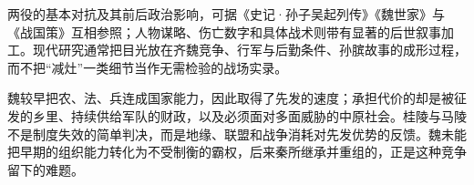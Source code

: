 \begin{sourcenote}[桂陵、马陵与魏国衰势]
两役的基本对抗及其前后政治影响，可据《史记·孙子吴起列传》《魏世家》与《战国策》互相参照；人物谋略、伤亡数字和具体战术则带有显著的后世叙事加工。现代研究通常把目光放在齐魏竞争、行军与后勤条件、孙膑故事的成形过程，而不把“减灶”一类细节当作无需检验的战场实录。
\end{sourcenote}

\begin{turningpoint}
魏较早把农、法、兵连成国家能力，因此取得了先发的速度；承担代价的却是被征发的乡里、持续供给军队的财政，以及必须面对多面威胁的中原社会。桂陵与马陵不是制度失效的简单判决，而是地缘、联盟和战争消耗对先发优势的反馈。魏未能把早期的组织能力转化为不受制衡的霸权，后来秦所继承并重组的，正是这种竞争留下的难题。
\end{turningpoint}
